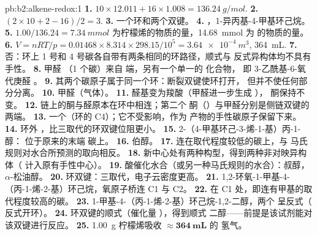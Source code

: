 \begin{solution}{pb:b2:alkene-redox:1}
\textbf{1.} $10 \times 12.011 + 16 \times 1.008 = \qty{136.24}{g/mol}$.
\textbf{2.} $(2 \times 10 + 2 - 16)/2 = 3$.
\textbf{3.} 一个环和两个双键。
\textbf{4.} ，1-异丙基-4-甲基环己烷。
\textbf{5.} $1.00/136.24 = \qty{7.34}{mmol}$ 为柠檬烯的物质的量，\qty{14.68}{mmol} 为  的物质的量。
\textbf{6.} $V = nRT/p = 0.01468 \times 8.314 \times 298.15/10^5 = \qty{3.64e-4}{m^3}$,
\qty{364}{mL}.
\textbf{7.} 否：环上 1 号和 4 号碳各自带有两条相同的环路径，顺式与
反式异构体均不具有手性。
\textbf{8.} 甲醛 （1 个碳）来自  端，另有一个单一的  化合物，
即 3-乙酰基-6-氧代庚醛 。
\textbf{9.} 其两个碳原子属于同一个环：断裂双键使环打开，
但并不使任何部分分离。
\textbf{10.} 甲醛（气体）。
\textbf{11.} 醛基变为羧酸（甲醛进一步生成 ），
酮保持不变。
\textbf{12.}  链上的酮与醛原本在环中相连；第二个
酮（）与甲醛分别是侧链双键的两端。
\textbf{13.} 一个（环的 C4）；它不受影响，作为
 产物的手性碳原子保留下来。
\textbf{14.} 环外 ，比三取代的环双键位阻更小。
\textbf{15.} 2-（4-甲基环己-3-烯-1-基）丙-1-醇： 位于原来的末端
碳上。
\textbf{16.} 伯醇。
\textbf{17.}  连在取代程度较低的碳上，与
马氏规则对水合所预测的取向相反。
\textbf{18.} 新中心处有两种构型，得到两种非对映异构体（
计入原有手性中心）。
\textbf{19.} 酸催化水合（或另一种马氏规则的水合）：叔醇，
$\alpha$-松油醇。
\textbf{20.} 环双键：三取代，电子云密度更高。
\textbf{21.} 1,2-环氧-1-甲基-4-（丙-1-烯-2-基）环己烷，氧原子桥连 C1 与 C2。
\textbf{22.} 在 C1 处，即连有甲基的取代程度较高的碳。
\textbf{23.} 1-甲基-4-（丙-1-烯-2-基）环己烷-1,2-二醇，两个  呈反式（
反式开环）。
\textbf{24.} 环双键的顺式（催化量 ），得到顺式
二醇——前提是该试剂能对该双键进行反应。
\textbf{25.} \qty{1.00}{g} 柠檬烯吸收 $\boldsymbol{\approx \qty{364}{mL}}$ 的
氢气。
\end{solution}
